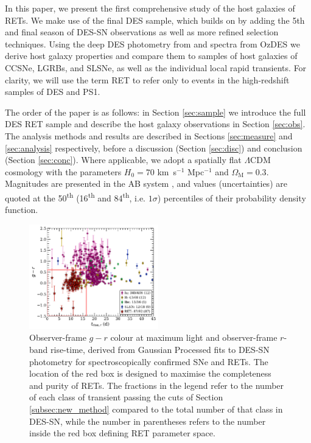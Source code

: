 \documentclass[fleqn,usenatbib,]{mnras}
\begin{document}
In this paper, we present the first comprehensive study of the host galaxies of RETs. We make use of the final DES sample, which builds on  by adding the 5th and final season of DES-SN observations as well as more refined selection techniques. Using the deep DES photometry from \citet[hereafter W20]{Wiseman2020} and spectra from OzDES \citep{Lidman2020} we derive host galaxy properties and compare them to samples of host galaxies of CCSNe, LGRBs, and SLSNe, as well as the individual local rapid transients. For clarity, we will use the term RET to refer only to events in the high-redshift samples of DES and PS1. 

The order of the paper is as follows: in Section \ref{sec:sample} we introduce the full DES RET sample and describe the host galaxy observations in Section \ref{sec:obs}. The analysis methods and results are described in Sections \ref{sec:measure} and \ref{sec:analysis} respectively, before a discussion (Section \ref{sec:disc}) and conclusion (Section \ref{sec:conc}).
Where applicable, we adopt a spatially flat $\Lambda$CDM cosmology with the parameters $H_0=70$ km~s$^{-1}$ Mpc$^{-1}$ and $\Omega_{\textrm{M}}=0.3$. Magnitudes are presented in the AB system \citep{Oke1983}, and values (uncertainties) are quoted at the 50\textsuperscript{th} (16\textsuperscript{th} and 84\textsuperscript{th}, i.e. $1\sigma$) percentiles of their probability density function.

\begin{figure}
\includegraphics[width=0.5\textwidth]{figs/spec_gr_trise_r_GP5_new_colorscheme.pdf}
\caption{Observer-frame $g-r$ colour at maximum light and observer-frame $r$-band rise-time, derived from Gaussian Processed fits to DES-SN photometry for spectroscopically confirmed SNe and  RETs. The location of the red box is designed to maximise the completeness and purity of RETs. The fractions in the legend refer to the number of each class of transient passing the cuts of Section \ref{subsec:new_method} compared to the total number of that class in DES-SN, while the number in parentheses refers to the number inside the red box defining RET parameter space. 
\label{fig:selection}}
\end{figure}
\end{document}
